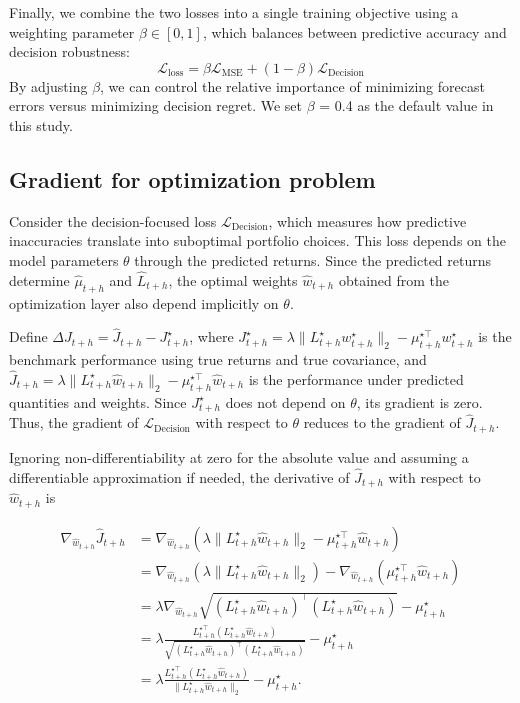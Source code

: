 Finally, we combine the two losses into a single training objective using a weighting parameter $\beta \in [0,1]$, which balances between predictive accuracy and decision robustness:
\begin{equation}
    \mathcal{L}_{\mathrm{loss}}=\beta \mathcal{L}_{\mathrm{MSE}}+(1-\beta) \mathcal{L}_{\mathrm{Decision}}
\end{equation}
By adjusting $\beta$, we can control the relative importance of minimizing forecast errors versus minimizing decision regret. We set $\beta$ = 0.4 as the default value in this study. 

\subsection{Gradient for optimization problem} Consider the decision-focused loss $\mathcal{L}_{\mathrm{Decision}}$, which measures how predictive inaccuracies translate into suboptimal portfolio choices. This loss depends on the model parameters $\theta$ through the predicted returns. Since the predicted returns determine $\hat{\mu}_{t+h}$ and $\hat{L}_{t+h}$, the optimal weights $\hat{w}_{t+h}$ obtained from the optimization layer also depend implicitly on $\theta$.

Define $\Delta J_{t+h} = \hat{J}_{t+h} - J_{t+h}^{\star}$, where $J_{t+h}^{\star} = \lambda \|L_{t+h}^{\star} w_{t+h}^{\star}\|_2 - \mu_{t+h}^{\star \top} w_{t+h}^{\star}$ is the benchmark performance using true returns and true covariance, and $\hat{J}_{t+h} = \lambda \|L_{t+h}^{\star} \hat{w}_{t+h}\|_2 - \mu_{t+h}^{\star \top} \hat{w}_{t+h}$ is the performance under predicted quantities and weights. Since $J_{t+h}^{\star}$ does not depend on $\theta$, its gradient is zero. Thus, the gradient of $\mathcal{L}_{\mathrm{Decision}}$ with respect to $\theta$ reduces to the gradient of $\hat{J}_{t+h}$.

Ignoring non-differentiability at zero for the absolute value and assuming a differentiable approximation if needed, the derivative of $\hat{J}_{t+h}$ with respect to $\hat{w}_{t+h}$ is

\begin{equation}
\begin{aligned}
\nabla_{\hat{w}_{t+h}}\hat{J}_{t+h} &= \nabla_{\hat{w}_{t+h}}\left(\lambda \|L_{t+h}^{\star}\hat{w}_{t+h}\|_2 - \mu_{t+h}^{\star \top}\hat{w}_{t+h}\right) \\
&= \nabla_{\hat{w}_{t+h}}\left(\lambda \|L_{t+h}^{\star}\hat{w}_{t+h}\|_2\right) 
- \nabla_{\hat{w}_{t+h}}\left(\mu_{t+h}^{\star \top}\hat{w}_{t+h}\right) \\
&= \lambda \nabla_{\hat{w}_{t+h}}\sqrt{(L_{t+h}^{\star}\hat{w}_{t+h})^{\top}(L_{t+h}^{\star}\hat{w}_{t+h})} 
- \mu_{t+h}^{\star} \\
&= \lambda \frac{L_{t+h}^{\star \top}(L_{t+h}^{\star}\hat{w}_{t+h})}{\sqrt{(L_{t+h}^{\star}\hat{w}_{t+h})^{\top}(L_{t+h}^{\star}\hat{w}_{t+h})}} 
- \mu_{t+h}^{\star} \\
&= \lambda \frac{L_{t+h}^{\star \top}(L_{t+h}^{\star}\hat{w}_{t+h})}{\|L_{t+h}^{\star}\hat{w}_{t+h}\|_2} - \mu_{t+h}^{\star}.
\end{aligned}
\end{equation}



